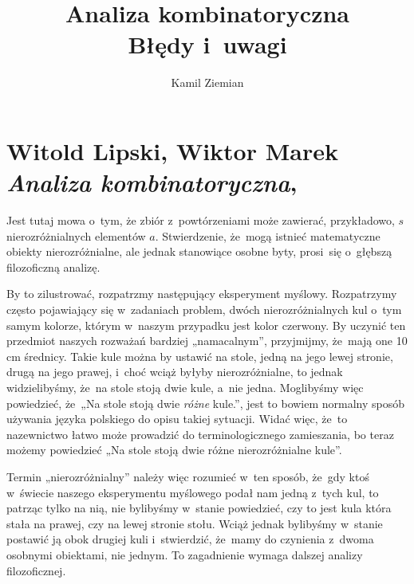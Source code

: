 \documentclass[a4paper,11pt]{article}
\title{Analiza kombinatoryczna \\
  {\Large Błędy i~uwagi}}
\author{Kamil Ziemian}
\numberwithin{equation}{section}
\begin{document}





\maketitle %





\section{ %
  Witold Lipski, Wiktor Marek \\
  \textit{Analiza kombinatoryczna},
  \cite{LipskiMarekAnalizaKombinatoryczna1986}}

\vspace{0em}



\vspace{0em}


\noindent
{} Jest tutaj mowa o~tym, że zbiór z~powtórzeniami może
zawierać, przykładowo, $s$ nierozróżnialnych elementów $a$. Stwierdzenie,
że~mogą istnieć matematyczne obiekty nierozróżnialne, ale jednak stanowiące
osobne byty, prosi~się o~głębszą filozoficzną analizę.

By to zilustrować, rozpatrzmy następujący eksperyment myślowy. Rozpatrzymy
często pojawiający się w~zadaniach problem, dwóch nierozróżnialnych kul
o~tym samym kolorze, którym w~naszym przypadku jest kolor czerwony. By
uczynić ten przedmiot naszych rozważań bardziej „namacalnym”, przyjmijmy,
że~mają one 10 cm średnicy. Takie kule można by ustawić na stole, jedną na
jego lewej stronie, drugą na jego prawej, i~choć wciąż byłyby
nierozróżnialne, to jednak widzielibyśmy, że~na stole stoją dwie kule,
a~nie jedna. Moglibyśmy więc powiedzieć, że~„Na stole stoją dwie
\textit{różne} kule.”, jest to bowiem normalny sposób używania języka
polskiego do opisu takiej sytuacji. Widać więc, że~to nazewnictwo łatwo
może prowadzić do terminologicznego zamieszania, bo teraz możemy powiedzieć
„Na stole stoją dwie różne nierozróżnialne kule”.

Termin „nierozróżnialny” należy więc rozumieć w~ten sposób, że~gdy ktoś
w~świecie naszego eksperymentu myślowego podał nam jedną z~tych kul, to
patrząc tylko na nią, nie bylibyśmy w~stanie powiedzieć, czy to jest kula
która stała na prawej, czy na lewej stronie stołu. Wciąż jednak bylibyśmy
w~stanie postawić ją obok drugiej kuli i~stwierdzić, że~mamy do czynienia
z~dwoma osobnymi obiektami, nie jednym. To zagadnienie wymaga dalszej analizy
filozoficznej.
\end{document}
